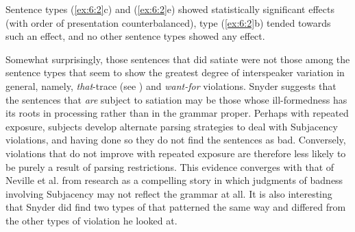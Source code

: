  \noindent
Sentence types (\ref{ex:6:2}c) and (\ref{ex:6:2}e) showed statistically significant  effects (with order of presentation counterbalanced), type (\ref{ex:6:2}b) tended towards such an effect, and no other sentence types showed any effect.

 Somewhat surprisingly, those sentences that did satiate were not those among the sentence types that seem to show the greatest degree of interspeaker variation in general, namely, \textit{that}-trace (see ) and \textit{want-for} violations. Snyder suggests that the sentences that \textit{are} subject to satiation may be those whose ill-formedness has its roots in processing rather than in the grammar proper. Perhaps with repeated exposure, subjects develop alternate parsing strategies to deal with Subjacency violations, and having done so they do not find the sentences as bad. Conversely, violations that do not improve with repeated exposure are therefore less likely to be purely a result of parsing restrictions. This evidence converges with that of Neville et al. from  research as a compelling story in which judgments of badness involving Subjacency may not reflect the grammar at all. It is also interesting that Snyder did find two types of  that patterned the same way and differed from the other types of violation he looked at.

